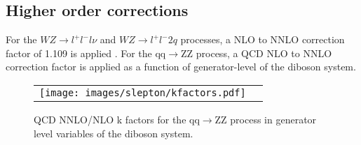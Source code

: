 \subsection*{Higher order corrections}\label{higherOrderCorr}
\noindent\justify
For the $WZ\rightarrow  l^{+}l^{-} l\nu$ and $WZ\rightarrow  l^{+}l^{-}2q$ processes, a NLO to NNLO correction factor of 1.109 is applied \cite{Grazzini:2016swo}. For the qq$\rightarrow$ZZ 
process, a QCD NLO to NNLO correction factor is applied as a function of generator-level \pt of the diboson system.
\begin{figure}[!h]
\begin{center}
\begin{tabular}{cc}
\texttt{[image: images/slepton/kfactors.pdf]} \\
\end{tabular}
\caption{QCD NNLO/NLO k factors for the qq$\rightarrow$ZZ process in generator level variables of the diboson system. }
\label{fig:ZZkfactor}
\end{center}
\end{figure}                                                                                                                                                                                

                                                                                                                                                                                                                                                                                                                                                                                                                                                                                                                                                                        
